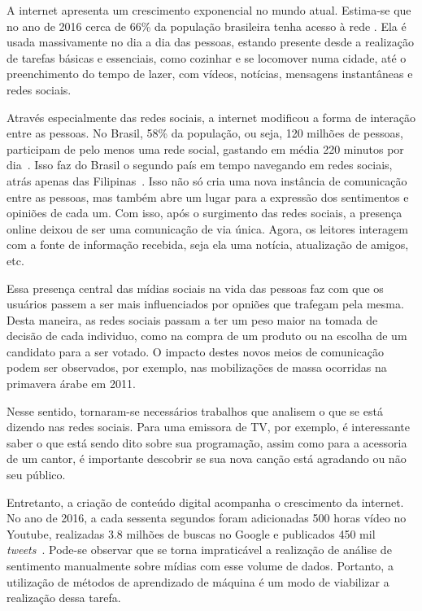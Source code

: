 
A internet apresenta um crescimento exponencial no mundo atual.
Estima-se que no ano de 2016 cerca de 66\% da população brasileira tenha acesso à rede \cite{social17}.
Ela é usada massivamente no dia a dia das pessoas, estando presente desde a realização de tarefas básicas e essenciais,
como cozinhar e se locomover numa cidade, até o preenchimento do tempo de lazer, com vídeos, notícias, mensagens
instantâneas e redes sociais.

Através especialmente das redes sociais, a internet modificou a forma de interação entre as pessoas.
No Brasil, 58\% da população, ou seja, 120 milhões de pessoas, participam de pelo menos uma rede social, gastando em
média 220 minutos por dia~\cite{social17}.
Isso faz do Brasil o segundo país em tempo navegando em redes sociais, atrás apenas das Filipinas~\cite{social17}.
Isso não só cria uma nova instância de comunicação entre as pessoas, mas também abre um lugar para a expressão dos
sentimentos e opiniões de cada um.
Com isso, após o surgimento das redes sociais, a presença online deixou de ser uma comunicação de via única.
Agora, os leitores interagem com a fonte de informação recebida, seja ela uma notícia, atualização de amigos, etc.

Essa presença central das mídias sociais na vida das pessoas faz com que os usuários passem a ser mais influenciados
por opniões que trafegam pela mesma.
Desta maneira, as redes sociais passam a ter um peso maior na tomada de decisão de cada individuo, como na compra de
um produto ou na escolha de um candidato para a ser votado.
O impacto destes novos meios de comunicação podem ser observados, por exemplo, nas mobilizações de massa ocorridas na
primavera árabe em 2011.

Nesse sentido, tornaram-se necessários trabalhos que analisem o que se está dizendo nas redes sociais.
Para uma emissora de TV, por exemplo, é interessante saber o que está sendo dito sobre sua programação, assim como para
a acessoria de um cantor, é importante descobrir se sua nova canção está agradando ou não seu público.

Entretanto, a criação de conteúdo digital acompanha o crescimento da internet.
No ano de 2016, a cada sessenta segundos foram adicionadas 500 horas vídeo no Youtube, realizadas 3.8 milhões de buscas
no Google e publicados 450 mil \textit{tweets}~\cite{smartinsights}.
Pode-se observar que se torna impraticável a realização de análise de sentimento manualmente sobre mídias com esse volume
de dados.
Portanto, a utilização de métodos de aprendizado de máquina é um modo de viabilizar a realização dessa tarefa.

